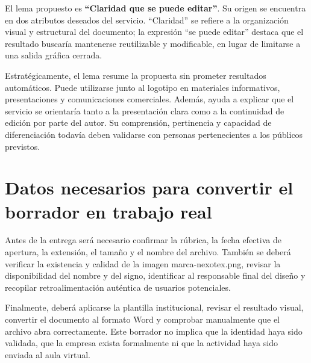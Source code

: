 \documentclass[12pt,letterpaper,oneside]{article}
\begin{document}
El lema propuesto es \textbf{``Claridad que se puede editar''}. Su origen se encuentra en dos atributos deseados del servicio. ``Claridad'' se refiere a la organización visual y estructural del documento; la expresión ``se puede editar'' destaca que el resultado buscaría mantenerse reutilizable y modificable, en lugar de limitarse a una salida gráfica cerrada.

Estratégicamente, el lema resume la propuesta sin prometer resultados automáticos. Puede utilizarse junto al logotipo en materiales informativos, presentaciones y comunicaciones comerciales. Además, ayuda a explicar que el servicio se orientaría tanto a la presentación clara como a la continuidad de edición por parte del autor. Su comprensión, pertinencia y capacidad de diferenciación todavía deben validarse con personas pertenecientes a los públicos previstos.

\section{Datos necesarios para convertir el borrador en trabajo real}

Antes de la entrega será necesario confirmar la rúbrica, la fecha efectiva de apertura, la extensión, el tamaño y el nombre del archivo. También se deberá verificar la existencia y calidad de la imagen marca-nexotex.png, revisar la disponibilidad del nombre y del signo, identificar al responsable final del diseño y recopilar retroalimentación auténtica de usuarios potenciales.

Finalmente, deberá aplicarse la plantilla institucional, revisar el resultado visual, convertir el documento al formato Word y comprobar manualmente que el archivo abra correctamente. Este borrador no implica que la identidad haya sido validada, que la empresa exista formalmente ni que la actividad haya sido enviada al aula virtual.
\clearpage
\printbibliography[title={Fuentes de consulta}]
\end{document}
